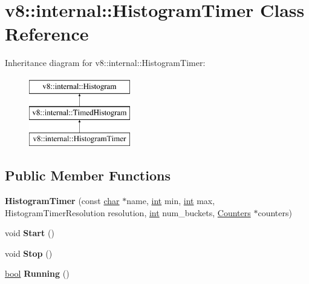 \hypertarget{classv8_1_1internal_1_1HistogramTimer}{}\section{v8\+:\+:internal\+:\+:Histogram\+Timer Class Reference}
\label{classv8_1_1internal_1_1HistogramTimer}
Inheritance diagram for v8\+:\+:internal\+:\+:Histogram\+Timer\+:\begin{figure}[H]
\begin{center}
\leavevmode
\includegraphics[height=3.000000cm]{classv8_1_1internal_1_1HistogramTimer}
\end{center}
\end{figure}
\subsection*{Public Member Functions}
\begin{DoxyCompactItemize}
\item 
\mbox{\label{classv8_1_1internal_1_1HistogramTimer_a1510668950249e1098262d06b80ea90f}} 
{\bfseries Histogram\+Timer} (const \mbox{\hyperlink{classchar}{char}} $\ast$name, \mbox{\hyperlink{classint}{int}} min, \mbox{\hyperlink{classint}{int}} max, Histogram\+Timer\+Resolution resolution, \mbox{\hyperlink{classint}{int}} num\+\_\+buckets, \mbox{\hyperlink{classv8_1_1internal_1_1Counters}{Counters}} $\ast$counters)
\item 
\mbox{\label{classv8_1_1internal_1_1HistogramTimer_ac979127ffb542e53c66dc5d700f4bd9e}} 
void {\bfseries Start} ()
\item 
\mbox{\label{classv8_1_1internal_1_1HistogramTimer_a890953c74235f44308230d445ebf9f1b}} 
void {\bfseries Stop} ()
\item 
\mbox{\label{classv8_1_1internal_1_1HistogramTimer_ae7e03caff0533d469e5abfcf4da70da2}} 
\mbox{\hyperlink{classbool}{bool}} {\bfseries Running} ()
\end{DoxyCompactItemize}
